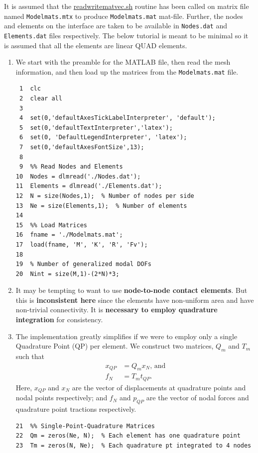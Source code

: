 \documentclass[11pt]{article}
\begin{document}
It is assumed that the \href{https://github.com/Nidish96/Abaqus4Joints/blob/main/scripts/readwritematvec.sh}{readwritematvec.sh} routine has been called on matrix file named \texttt{Modelmats.mtx} to produce \texttt{Modelmats.mat} mat-file.
Further, the nodes and elements on the interface are taken to be available in \texttt{Nodes.dat} and \texttt{Elements.dat} files respectively.
The below tutorial is meant to be minimal so it is assumed that all the elements are linear QUAD elements.
\begin{enumerate}
\item We start with the preamble for the MATLAB file, then read the mesh information, and then load up the matrices from the \texttt{Modelmats.mat} file.
\begin{verbatim}
 1  clc
 2  clear all
 3  
 4  set(0,'defaultAxesTickLabelInterpreter', 'default');
 5  set(0,'defaultTextInterpreter','latex');
 6  set(0, 'DefaultLegendInterpreter', 'latex');
 7  set(0,'defaultAxesFontSize',13);
 8  
 9  %% Read Nodes and Elements
10  Nodes = dlmread('./Nodes.dat');
11  Elements = dlmread('./Elements.dat');
12  N = size(Nodes,1);  % Number of nodes per side
13  Ne = size(Elements,1);  % Number of elements
14  
15  %% Load Matrices
16  fname = './Modelmats.mat';
17  load(fname, 'M', 'K', 'R', 'Fv');
18  
19  % Number of generalized modal DOFs
20  Nint = size(M,1)-(2*N)*3;
\end{verbatim}
\item It may be tempting to want to use \textbf{node-to-node contact elements}.
But this is \textbf{inconsistent here} since the elements have non-uniform area and have non-trivial connectivity.
It is \textbf{necessary to employ quadrature integration} for consistency.
\item The implementation greatly simplifies if we were to employ only a single Quadrature Point (QP) per element.
We construct two matrices, \(Q_m\) and \(T_m\) such that
\begin{align*}
x_{QP} &= Q_{m} x_N \text{, and}\\
f_N &= T_{m} t_{QP}.
\end{align*}
Here, \(x_{QP}\) and \(x_N\) are the vector of displacements at quadrature points and nodal points respectively; and
\(f_N\) and \(p_{QP}\) are the vector of nodal forces and quadrature point tractions respectively.
\begin{verbatim}
21  %% Single-Point-Quadrature Matrices
22  Qm = zeros(Ne, N);  % Each element has one quadrature point
23  Tm = zeros(N, Ne);  % Each quadrature pt integrated to 4 nodes

\end{verbatim}
\end{enumerate}
\end{document}
